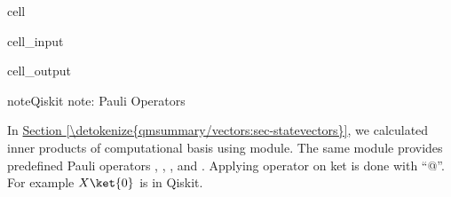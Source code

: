 \documentclass[letterpaper,10pt,english]{jupyterBook}
\begin{document}
\begin{sphinxuseclass}{cell}\begin{sphinxVerbatimInput}

\begin{sphinxuseclass}{cell_input}
\begin{sphinxVerbatim}[commandchars=\\\{\}]
  
  
  

   

\end{sphinxVerbatim}

\end{sphinxuseclass}\end{sphinxVerbatimInput}
\begin{sphinxVerbatimOutput}

\begin{sphinxuseclass}{cell_output}
\noindent{}

\end{sphinxuseclass}\end{sphinxVerbatimOutput}

\end{sphinxuseclass}
\begin{sphinxadmonition}{note}{Qiskit note: Pauli Operators}

\sphinxAtStartPar
In \hyperref[\detokenize{qmsummary/vectors:sec-statevectors}]{Section \ref{\detokenize{qmsummary/vectors:sec-statevectors}}}, we calculated inner products of computational basis using  module.  The same module provides predefined Pauli operators  , , , and .   Applying operator on ket is done with “@”.  For example \(X \ket{0}\) is  in Qiskit.

\sphinxAtStartPar
{}
\end{sphinxadmonition}
\end{document}
